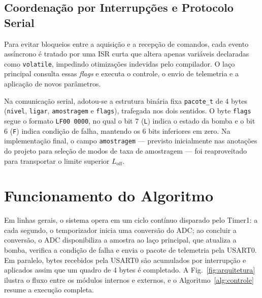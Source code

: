 \documentclass[conference]{IEEEtran}
\begin{document}
\subsection{Coordenação por Interrupções e Protocolo Serial}
Para evitar bloqueios entre a aquisição e a recepção de comandos, cada evento assíncrono é tratado por uma ISR curta que altera apenas variáveis declaradas como \texttt{volatile}, impedindo otimizações indevidas pelo compilador. O laço principal consulta essas \textit{flags} e executa o controle, o envio de telemetria e a aplicação de novos parâmetros.

Na comunicação serial, adotou-se a estrutura binária fixa \texttt{pacote\_t} de 4 bytes (\texttt{nivel}, \texttt{ligar}, \texttt{amostragem} e \texttt{flags}), trafegada nos dois sentidos. O byte \texttt{flags} segue o formato \texttt{LF00 0000}, no qual o bit 7 (\texttt{L}) indica o estado da bomba e o bit 6 (\texttt{F}) indica condição de falha, mantendo os 6 bits inferiores em zero. Na implementação final, o campo \texttt{amostragem} — previsto inicialmente nas anotações do projeto para seleção de modos de taxa de amostragem — foi reaproveitado para transportar o limite superior $L_{\text{off}}$.

\section{Funcionamento do Algoritmo}
Em linhas gerais, o sistema opera em um ciclo contínuo disparado pelo Timer1: a cada segundo, o temporizador inicia uma conversão do ADC; ao concluir a conversão, o ADC disponibiliza a amostra ao laço principal, que atualiza a bomba, verifica a condição de falha e envia o pacote de telemetria pela USART0. Em paralelo, bytes recebidos pela USART0 são acumulados por interrupção e aplicados assim que um quadro de 4 bytes é completado. A Fig.~\ref{fig:arquitetura} ilustra o fluxo entre os módulos internos e externos, e o Algoritmo~\ref{alg:controle} resume a execução completa.
\end{document}
